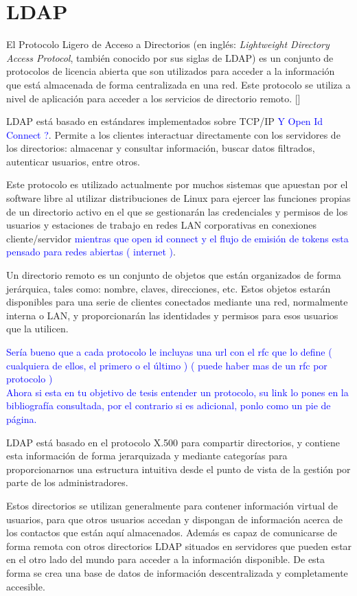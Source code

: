 \section{LDAP}
El Protocolo Ligero de Acceso a Directorios (en inglés: \textit{Lightweight Directory Access Protocol}, también conocido por sus siglas de LDAP) es un conjunto de protocolos de licencia abierta que son utilizados para acceder a la información que está almacenada de forma centralizada en una red. Este protocolo se utiliza a nivel de aplicación para acceder a los servicios de directorio remoto. [\cite{ldap-doc}]

LDAP está basado en estándares implementados sobre TCP/IP \textcolor{blue}{Y Open Id Connect ?}. Permite a los clientes interactuar directamente con los servidores de los directorios: almacenar y consultar información, buscar datos filtrados, autenticar usuarios, entre otros.

Este protocolo es utilizado actualmente por muchos sistemas que apuestan por el software libre al utilizar distribuciones de Linux para ejercer las funciones propias de un directorio activo en el que se gestionarán las credenciales y permisos de los usuarios y estaciones de trabajo en redes LAN corporativas en conexiones cliente/servidor \textcolor{blue}{mientras que open id connect y el flujo de emisión de tokens esta pensado para redes abiertas ( internet )}.

Un directorio remoto es un conjunto de objetos que están organizados de forma jerárquica, tales como: nombre, claves, direcciones, etc. Estos objetos estarán disponibles para una serie de clientes conectados mediante una red, normalmente interna o LAN, y proporcionarán las identidades y permisos para esos usuarios que la utilicen.

\textcolor{blue}{Sería bueno que a cada protocolo le incluyas una url con el rfc que lo define ( cualquiera de ellos, el primero o el último ) ( puede haber mas de un rfc por protocolo )
\\
Ahora si esta en tu objetivo de tesis entender un protocolo, su link lo pones en la bibliografía consultada, por el contrario si es adicional, ponlo como un pie de página.}

LDAP está basado en el protocolo X.500 para compartir directorios, y contiene esta información de forma jerarquizada y mediante categorías para proporcionarnos una estructura intuitiva desde el punto de vista de la gestión por parte de los administradores.

Estos directorios se utilizan generalmente para contener información virtual de usuarios, para que otros usuarios accedan y dispongan de información acerca de los contactos que están aquí almacenados. Además es capaz de comunicarse de forma remota con otros directorios LDAP situados en servidores que pueden estar en el otro lado del mundo para acceder a la información disponible. De esta forma se crea una base de datos de información descentralizada y completamente accesible.
 
